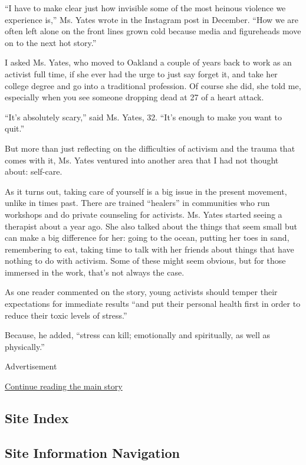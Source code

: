 ``I have to make clear just how invisible some of the most heinous
violence we experience is,'' Ms. Yates wrote in the Instagram post in
December. ``How we are often left alone on the front lines grown cold
because media and figureheads move on to the next hot story.''

I asked Ms. Yates, who moved to Oakland a couple of years back to work
as an activist full time, if she ever had the urge to just say forget
it, and take her college degree and go into a traditional profession. Of
course she did, she told me, especially when you see someone dropping
dead at 27 of a heart attack.

``It's absolutely scary,'' said Ms. Yates, 32. ``It's enough to make you
want to quit.''

But more than just reflecting on the difficulties of activism and the
trauma that comes with it, Ms. Yates ventured into another area that I
had not thought about: self-care.

As it turns out, taking care of yourself is a big issue in the present
movement, unlike in times past. There are trained ``healers'' in
communities who run workshops and do private counseling for activists.
Ms. Yates started seeing a therapist about a year ago. She also talked
about the things that seem small but can make a big difference for her:
going to the ocean, putting her toes in sand, remembering to eat, taking
time to talk with her friends about things that have nothing to do with
activism. Some of these might seem obvious, but for those immersed in
the work, that's not always the case.

As one reader commented on the story, young activists should temper
their expectations for immediate results ``and put their personal health
first in order to reduce their toxic levels of stress.''

Because, he added, ``stress can kill; emotionally and spiritually, as
well as physically.''

Advertisement

\protect\hyperlink{after-bottom}{Continue reading the main story}

\hypertarget{site-index}{%
\subsection{Site Index}\label{site-index}}

\hypertarget{site-information-navigation}{%
\subsection{Site Information
Navigation}\label{site-information-navigation}}

